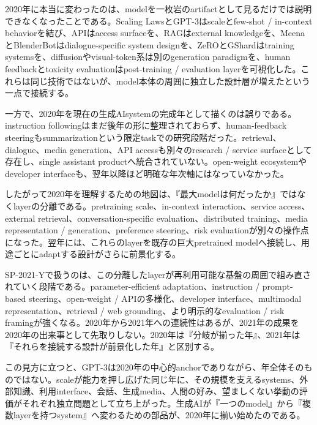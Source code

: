 2020年に本当に変わったのは、modelを一枚岩のartifactとして見るだけでは説明できなくなったことである。Scaling LawsとGPT-3はscaleとfew-shot / in-context behaviorを結び、APIはaccess surfaceを、RAGはexternal knowledgeを、MeenaとBlenderBotはdialogue-specific system designを、ZeROとGShardはtraining systemsを、diffusionやvisual-token系は別のgeneration paradigmを、human feedbackとtoxicity evaluationはpost-training / evaluation layerを可視化した。これらは同じ技術ではないが、model本体の周囲に独立した設計層が増えたという一点で接続する。


一方で、2020年を現在の生成AIsystemの完成年として描くのは誤りである。instruction followingはまだ後年の形に整理されておらず、human-feedback steeringもsummarizationという限定taskでの研究段階だった。retrieval、dialogue、media generation、API accessも別々のresearch / service surfaceとして存在し、single assistant productへ統合されていない。open-weight ecosystemやdeveloper interfaceも、翌年以降ほど明確な年次軸にはなっていなかった。


したがって2020年を理解するための地図は、『最大modelは何だったか』ではなくlayerの分離である。pretraining scale、in-context interaction、service access、external retrieval、conversation-specific evaluation、distributed training、media representation / generation、preference steering、risk evaluationが別々の操作点になった。翌年には、これらのlayerを既存の巨大pretrained modelへ接続し、用途ごとにadaptする設計がさらに前景化する。


SP-2021-Yで扱うのは、この分離したlayerが再利用可能な基盤の周囲で組み直されていく段階である。parameter-efficient adaptation、instruction / prompt-based steering、open-weight / APIの多様化、developer interface、multimodal representation、retrieval / web grounding、より明示的なevaluation / risk framingが強くなる。2020年から2021年への連続性はあるが、2021年の成果を2020年の出来事として先取りしない。2020年は『分岐が揃った年』、2021年は『それらを接続する設計が前景化した年』と区別する。


この見方に立つと、GPT-3は2020年の中心的anchorでありながら、年全体そのものではない。scaleが能力を押し広げた同じ年に、その規模を支えるsystems、外部知識、利用interface、会話、生成media、人間の好み、望ましくない挙動の評価がそれぞれ独立問題として立ち上がった。生成AIが『一つのmodel』から『複数layerを持つsystem』へ変わるための部品が、2020年に揃い始めたのである。
